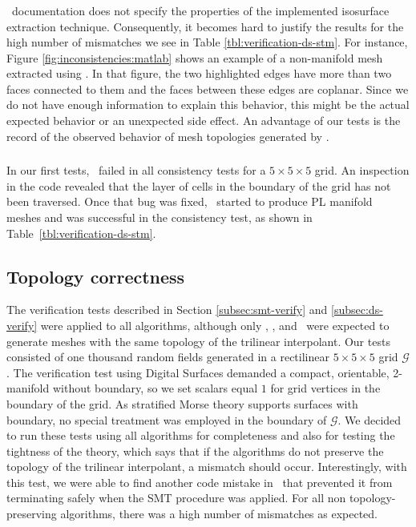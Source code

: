 \subsubsection{\matlab}

\matlab\ documentation does not specify the properties of the
implemented isosurface extraction technique. Consequently, it becomes
hard to justify the results for the high number of mismatches we see
in Table \ref{tbl:verification-ds-stm}.  For instance, Figure
\ref{fig:inconsistencies:matlab} shows an example of a non-manifold
mesh extracted using \matlab. In that figure, the two highlighted
edges have more than two faces connected to them and the faces between
these edges are coplanar.  Since we do not have enough information to
explain this behavior, this might be the actual expected behavior or
an unexpected side effect. An advantage of our tests is the record of
the observed behavior of mesh topologies generated by \matlab.

\subsubsection{\macet}

In our first tests, \macet\ failed in all consistency tests for a $5 \times 5 \times 5$ grid. 
An inspection in the code revealed that the layer of cells in the boundary of the grid
has not been traversed. Once that bug was fixed, \macet\ started to produce
PL manifold
meshes and was successful in the consistency test, as shown in Table~\ref{tbl:verification-ds-stm}.

\subsection{Topology correctness}
\label{sec:correctness}


The verification tests described in Section \ref{subsec:smt-verify}
and \ref{subsec:ds-verify} were applied to all algorithms, although
only \mclewiner, \deliso, and \mcsimpleflow\ were expected to generate
meshes with the same topology of the trilinear interpolant. Our tests
consisted of one thousand random fields generated in a rectilinear $5
\times 5 \times 5$ grid $\mathcal{G}$.  The verification test using
Digital Surfaces demanded a compact, orientable, 2-manifold without
boundary, so we set scalars equal $1$ for grid vertices in the
boundary of the grid.  As stratified Morse theory supports surfaces
with boundary, no special treatment was employed in the boundary of
$\mathcal{G}$. We decided to run these tests using all algorithms for
completeness and also for testing the tightness of the theory, which
says that if the algorithms do not preserve the topology of the
trilinear interpolant, a mismatch should occur.  Interestingly, with
this test, we were able to find another code mistake in \macet\ that
prevented it from terminating safely when the SMT procedure was applied. 
For all non topology-preserving algorithms, there was a high
number of mismatches as expected.

